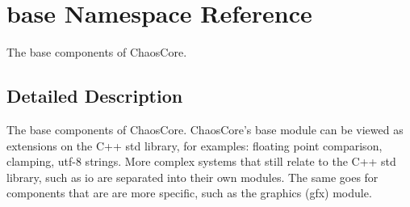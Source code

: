 \hypertarget{namespacebase}{\section{base Namespace Reference}
\label{namespacebase}
}


The base components of Chaos\-Core.  




\subsection{Detailed Description}
The base components of Chaos\-Core. Chaos\-Core's base module can be viewed as extensions on the C++ std library, for examples\-: floating point comparison, clamping, utf-\/8 strings. More complex systems that still relate to the C++ std library, such as io are separated into their own modules. The same goes for components that are are more specific, such as the graphics (gfx) module. 
